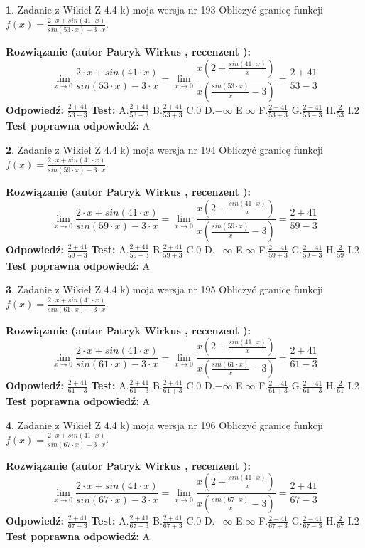 \documentclass[12pt, a4paper]{article}
\theoremstyle{definition} %
\newtheorem{zad}{}
\newcommand{\zadStart}[1]{\begin{zad}#1\newline}
\newcommand{\zadStop}{\end{zad}}
\newcommand{\rozwStart}[2]{\noindent \textbf{Rozwiązanie (autor #1 , recenzent #2): }\newline}
\newcommand{\rozwStop}{\newline}
\newcommand{\odpStart}{\noindent \textbf{Odpowiedź:}\newline}
\newcommand{\odpStop}{\newline}
\newcommand{\testStart}{\noindent \textbf{Test:}\newline}
\newcommand{\testStop}{\newline}
\newcommand{\kluczStart}{\noindent \textbf{Test poprawna odpowiedź:}\newline}
\newcommand{\kluczStop}{\newline}
\begin{document}
\zadStart{Zadanie z Wikieł Z 4.4 k) moja wersja nr 193}
Obliczyć granicę funkcji $f(x)=\frac{2\cdot x +sin(41\cdot x)}{sin(53\cdot x) -3\cdot x}$.
\zadStop
\rozwStart{Patryk Wirkus}{}
$$\lim\limits_{x\to 0}\frac{2\cdot x +sin(41\cdot x)}{sin(53\cdot x) -3\cdot x}
=\lim\limits_{x\to 0}\frac{x(2+\frac{sin(41\cdot x)}{x})}{x(\frac{sin(53\cdot x)}{x}-3)}
=\frac{2+41}{53-3}$$
\rozwStop
\odpStart
$\frac{2+41}{53-3}$
\odpStop
\testStart
A.$\frac{2+41}{53-3}$
B.$\frac{2+41}{53+3}$
C.$0$
D.$-\infty$
E.$\infty$
F.$\frac{2-41}{53+3}$
G.$\frac{2-41}{53-3}$
H.$\frac{2}{53}$
I.$2$
\testStop
\kluczStart
A
\kluczStop



\zadStart{Zadanie z Wikieł Z 4.4 k) moja wersja nr 194}
Obliczyć granicę funkcji $f(x)=\frac{2\cdot x +sin(41\cdot x)}{sin(59\cdot x) -3\cdot x}$.
\zadStop
\rozwStart{Patryk Wirkus}{}
$$\lim\limits_{x\to 0}\frac{2\cdot x +sin(41\cdot x)}{sin(59\cdot x) -3\cdot x}
=\lim\limits_{x\to 0}\frac{x(2+\frac{sin(41\cdot x)}{x})}{x(\frac{sin(59\cdot x)}{x}-3)}
=\frac{2+41}{59-3}$$
\rozwStop
\odpStart
$\frac{2+41}{59-3}$
\odpStop
\testStart
A.$\frac{2+41}{59-3}$
B.$\frac{2+41}{59+3}$
C.$0$
D.$-\infty$
E.$\infty$
F.$\frac{2-41}{59+3}$
G.$\frac{2-41}{59-3}$
H.$\frac{2}{59}$
I.$2$
\testStop
\kluczStart
A
\kluczStop



\zadStart{Zadanie z Wikieł Z 4.4 k) moja wersja nr 195}
Obliczyć granicę funkcji $f(x)=\frac{2\cdot x +sin(41\cdot x)}{sin(61\cdot x) -3\cdot x}$.
\zadStop
\rozwStart{Patryk Wirkus}{}
$$\lim\limits_{x\to 0}\frac{2\cdot x +sin(41\cdot x)}{sin(61\cdot x) -3\cdot x}
=\lim\limits_{x\to 0}\frac{x(2+\frac{sin(41\cdot x)}{x})}{x(\frac{sin(61\cdot x)}{x}-3)}
=\frac{2+41}{61-3}$$
\rozwStop
\odpStart
$\frac{2+41}{61-3}$
\odpStop
\testStart
A.$\frac{2+41}{61-3}$
B.$\frac{2+41}{61+3}$
C.$0$
D.$-\infty$
E.$\infty$
F.$\frac{2-41}{61+3}$
G.$\frac{2-41}{61-3}$
H.$\frac{2}{61}$
I.$2$
\testStop
\kluczStart
A
\kluczStop



\zadStart{Zadanie z Wikieł Z 4.4 k) moja wersja nr 196}
Obliczyć granicę funkcji $f(x)=\frac{2\cdot x +sin(41\cdot x)}{sin(67\cdot x) -3\cdot x}$.
\zadStop
\rozwStart{Patryk Wirkus}{}
$$\lim\limits_{x\to 0}\frac{2\cdot x +sin(41\cdot x)}{sin(67\cdot x) -3\cdot x}
=\lim\limits_{x\to 0}\frac{x(2+\frac{sin(41\cdot x)}{x})}{x(\frac{sin(67\cdot x)}{x}-3)}
=\frac{2+41}{67-3}$$
\rozwStop
\odpStart
$\frac{2+41}{67-3}$
\odpStop
\testStart
A.$\frac{2+41}{67-3}$
B.$\frac{2+41}{67+3}$
C.$0$
D.$-\infty$
E.$\infty$
F.$\frac{2-41}{67+3}$
G.$\frac{2-41}{67-3}$
H.$\frac{2}{67}$
I.$2$
\testStop
\kluczStart
A
\kluczStop
\end{document}
